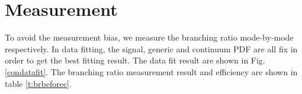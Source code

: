\section{Measurement}
To avoid the measurement bias, we measure the branching ratio mode-by-mode respectively. In data fitting, the signal, generic and continuum PDF are all fix in order to get the best fitting result. The data fit result are shown in Fig. \ref{condatafit}. The branching ratio measurement result and efficiency are shown in table \ref{t:brbeforec}.   
\begin{figure}[h]
	\centering

\end{figure}
